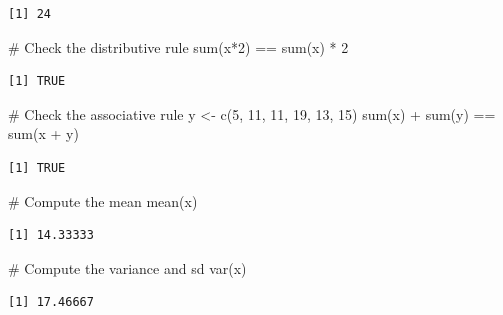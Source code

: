 \documentclass[
  letterpaper,
  DIV=11,
  numbers=noendperiod]{scrreprt}
\newenvironment{Shaded}{\begin{snugshade}}{\end{snugshade}}
\newcommand{\CommentTok}[1]{\textcolor[rgb]{0.37,0.37,0.37}{#1}}
\newcommand{\DecValTok}[1]{\textcolor[rgb]{0.68,0.00,0.00}{#1}}
\newcommand{\FunctionTok}[1]{\textcolor[rgb]{0.28,0.35,0.67}{#1}}
\newcommand{\NormalTok}[1]{\textcolor[rgb]{0.00,0.23,0.31}{#1}}
\newcommand{\OtherTok}[1]{\textcolor[rgb]{0.00,0.23,0.31}{#1}}
\newcommand{\SpecialCharTok}[1]{\textcolor[rgb]{0.37,0.37,0.37}{#1}}
\begin{document}
\begin{verbatim}
[1] 24
\end{verbatim}

\begin{Shaded}
\begin{Highlighting}[]
\CommentTok{\# Check the distributive rule}
\FunctionTok{sum}\NormalTok{(x}\SpecialCharTok{*}\DecValTok{2}\NormalTok{) }\SpecialCharTok{==} \FunctionTok{sum}\NormalTok{(x) }\SpecialCharTok{*} \DecValTok{2} 
\end{Highlighting}
\end{Shaded}

\begin{verbatim}
[1] TRUE
\end{verbatim}

\begin{Shaded}
\begin{Highlighting}[]
\CommentTok{\# Check the associative rule}
\NormalTok{y }\OtherTok{\textless{}{-}} \FunctionTok{c}\NormalTok{(}\DecValTok{5}\NormalTok{, }\DecValTok{11}\NormalTok{, }\DecValTok{11}\NormalTok{, }\DecValTok{19}\NormalTok{, }\DecValTok{13}\NormalTok{, }\DecValTok{15}\NormalTok{)}
\FunctionTok{sum}\NormalTok{(x) }\SpecialCharTok{+} \FunctionTok{sum}\NormalTok{(y) }\SpecialCharTok{==} \FunctionTok{sum}\NormalTok{(x }\SpecialCharTok{+}\NormalTok{ y) }
\end{Highlighting}
\end{Shaded}

\begin{verbatim}
[1] TRUE
\end{verbatim}

\begin{Shaded}
\begin{Highlighting}[]
\CommentTok{\# Compute the mean}
\FunctionTok{mean}\NormalTok{(x)}
\end{Highlighting}
\end{Shaded}

\begin{verbatim}
[1] 14.33333
\end{verbatim}

\begin{Shaded}
\begin{Highlighting}[]
\CommentTok{\# Compute the variance and sd}
\FunctionTok{var}\NormalTok{(x)}
\end{Highlighting}
\end{Shaded}

\begin{verbatim}
[1] 17.46667
\end{verbatim}
\end{document}

